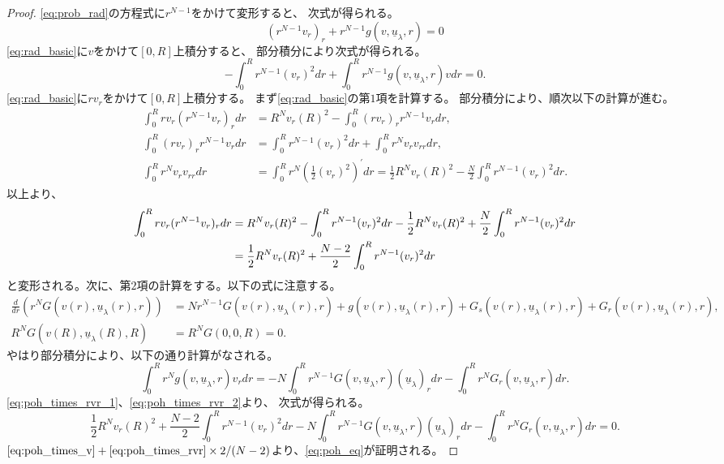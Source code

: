 \begin{proof}
 \eqref{eq:prob_rad}の方程式に$r^{N-1}$をかけて変形すると、
 次式が得られる。
 \begin{equation}
  (r^{N-1} v_r)_r + r^{N-1} g(v, \underline{u}_\lambda, r) = 0
   \label{eq:rad_basic} 
 \end{equation}
 \eqref{eq:rad_basic}に$v$をかけて$[0, R]$上積分すると、
 部分積分により次式が得られる。
 \begin{equation}
  - \int_0^R r^{N-1} (v_r)^2 dr + \int_0^R r^{N-1} g(v,
   \underline{u}_\lambda, r) v dr = 0.  \label{eq:poh_times_v}
 \end{equation}
 \eqref{eq:rad_basic}に$rv_r$をかけて$[0, R]$上積分する。
 まず\eqref{eq:rad_basic}の第$1$項を計算する。
 部分積分により、順次以下の計算が進む。
 \begin{align*}
  \int_0^R r v_r (r^{N-1} v_r)_r dr &= R^N v_r(R)^2 - \int_0^R
  (rv_r)_r r^{N-1} v_r dr, \\
  \int_0^R (rv_r)_r r^{N-1} v_r dr &= \int_0^R r^{N-1} (v_r)^2 dr +
  \int_0^R r^N v_r v_{rr} dr, \\
  \int_0^R r^N v_r v_{rr} dr &= \int_0^R r^N \left( \frac{1}{2}
  (v_r)^2 \right)^\prime dr = \frac{1}{2} R^N v_r(R)^2 - \frac{N}{2}
  \int_0^R r^{N-1} (v_r)^2 dr.
 \end{align*}
 以上より、
 \begin{align}
  \int_0^R r v_r (r^{N-1} v_r)_r dr &= R^N v_r(R)^2 - 
  \int_0^R r^{N-1} (v_r)^2 dr - \frac{1}{2} R^N v_r(R)^2 + \frac{N}{2}
  \int_0^R r^{N-1} (v_r)^2 dr \notag \\ 
  &= \frac{1}{2} R^N v_r(R)^2 + \frac{N-2}{2}\int_0^R r^{N-1} (v_r)^2
  dr \label{eq:poh_times_rvr_1}
 \end{align}
 と変形される。次に、第$2$項の計算をする。以下の式に注意する。
 \begin{align*}
  \frac{d}{dr} \left( r^N G(v(r), \underline{u}_\lambda(r), r )
  \right) &= N r^{N-1} G( v(r), \underline{u}_\lambda(r), r) + g(
  v(r), \underline{u}_\lambda(r), r) + G_s(v(r),
  \underline{u}_\lambda(r), r) + G_r(v(r), \underline{u}_\lambda(r),
  r), \\
  R^N G(v(R), \underline{u}_\lambda(R), R) &= R^N G(0, 0, R) = 0. 
 \end{align*}
 やはり部分積分により、以下の通り計算がなされる。
 \begin{equation}
  \int_0^R r^N g(v, \underline{u}_\lambda, r) v_r dr
   = -N \int_0^R r^{N-1} G(v, \underline{u}_\lambda, r)
   (\underline{u}_\lambda)_r dr - \int_0^R r^N G_r(v,
   \underline{u}_\lambda, r) dr. \label{eq:poh_times_rvr_2}
 \end{equation}
 \eqref{eq:poh_times_rvr_1}、\eqref{eq:poh_times_rvr_2}より、
 次式が得られる。
 \begin{equation}
  \frac{1}{2} R^N v_r(R)^2 + \frac{N-2}{2}\int_0^R r^{N-1} (v_r)^2
   dr -N \int_0^R r^{N-1} G(v, \underline{u}_\lambda, r)
   (\underline{u}_\lambda)_r dr - \int_0^R r^N G_r(v,
   \underline{u}_\lambda, r) dr = 0. \label{eq:poh_times_rvr}
 \end{equation}
 $\text{\eqref{eq:poh_times_v}} + \text{\eqref{eq:poh_times_rvr}} \times
 2/(N-2)$より、\eqref{eq:poh_eq}が証明される。\qedhere
\end{proof}

